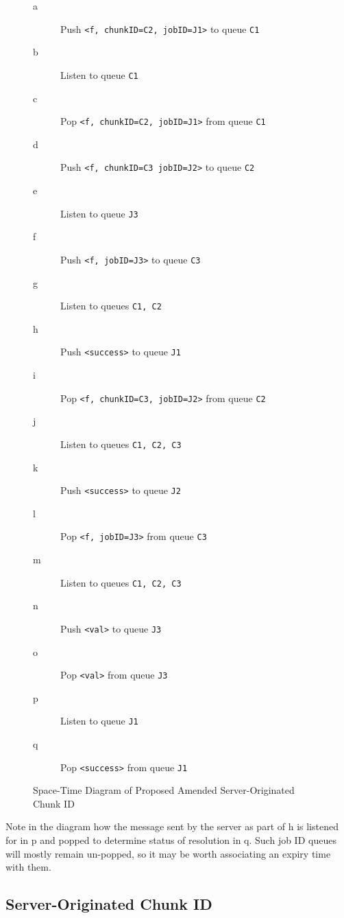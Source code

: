 \documentclass[a4paper,10pt]{article}
\begin{document}
\begin{figure}
	\setlength{\columnsep}{50pt}
	\begin{multicols}{2}
		\begin{description}
			\item [\textcolor{dark2-1}{a}] Push \texttt{<f, chunkID=C2, jobID=J1>} to queue \texttt{C1}
			\item [\textcolor{gray62}{b}] Listen to queue \texttt{C1}
			\item [\textcolor{dark2-1}{c}] Pop \texttt{<f, chunkID=C2, jobID=J1>} from queue \texttt{C1}
			\item [\textcolor{dark2-3}{d}] Push \texttt{<f, chunkID=C3 jobID=J2>} to queue \texttt{C2}
			\item [\textcolor{dark2-5}{e}] Listen to queue \texttt{J3}
			\item [\textcolor{dark2-5}{f}] Push \texttt{<f, jobID=J3>} to queue \texttt{C3}
			\item [\textcolor{gray62}{g}] Listen to queues \texttt{C1, C2}
			\item [\textcolor{dark2-1}{h}] Push \texttt{<success>} to queue \texttt{J1}
			\item [\textcolor{dark2-3}{i}] Pop \texttt{<f, chunkID=C3, jobID=J2>} from queue \texttt{C2}
			\item [\textcolor{gray62}{j}] Listen to queues \texttt{C1, C2, C3}
			\item [\textcolor{dark2-3}{k}] Push \texttt{<success>} to queue \texttt{J2}
			\item [\textcolor{dark2-5}{l}] Pop \texttt{<f, jobID=J3>} from queue \texttt{C3}
			\item [\textcolor{gray62}{m}] Listen to queues \texttt{C1, C2, C3}
			\item [\textcolor{dark2-5}{n}] Push \texttt{<val>} to queue \texttt{J3}
			\item [\textcolor{dark2-5}{o}] Pop \texttt{<val>} from queue \texttt{J3}
			\item [\textcolor{dark2-6}{p}] Listen to queue \texttt{J1}
			\item [\textcolor{dark2-6}{q}] Pop \texttt{<success>} from queue \texttt{J1}
		\end{description}
	\end{multicols}
	\caption{\label{fig:masi} Space-Time Diagram of Proposed Amended Server-Originated Chunk ID}
\end{figure}

Note in the diagram how the message sent by the server as part of
\textcolor{dark2-1}{h} is listened for in \textcolor{dark2-6}{p} and popped to
determine status of resolution in \textcolor{dark2-6}{q}.
Such job ID queues will mostly remain un-popped, so it may be worth associating
an expiry time with them.

\subsection{Server-Originated Chunk ID}
\printbibliography
\end{document}
